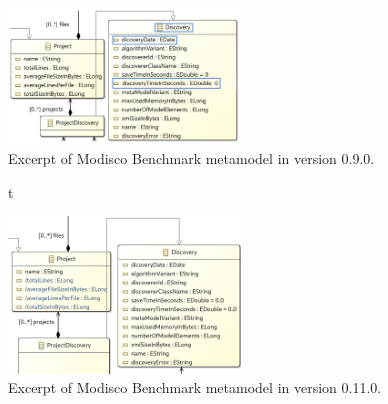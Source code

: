 \begin{figure}[t]
	
	\centering
	\includegraphics[width=0.55\textwidth]{./pics/chapter3pics/exampleV1.PNG}
	\caption{Excerpt of Modisco Benchmark metamodel in version 0.9.0.}
	\label{fig: ch3_BMMV1}
\end{figure}

\begin{figure}t
	
	\centering
	\includegraphics[width=0.55\textwidth]{./pics/chapter3pics/exampleV2.PNG}
	\caption{Excerpt of Modisco Benchmark metamodel in version 0.11.0.}
	\label{fig: ch3_BMMV2}
\end{figure}



